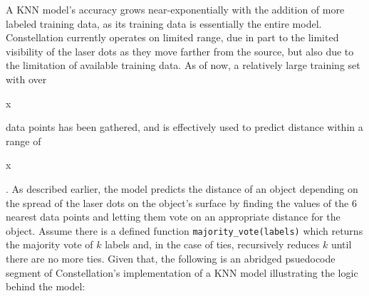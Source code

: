 

A KNN model's accuracy grows near-exponentially with the addition of more labeled training data, as its training data is essentially the entire model. Constellation currently operates on limited range, due in part to the limited visibility of the laser dots as they move farther from the source, but also due to the limitation of available training data. As of now, a relatively large training set with over \begin{it}x\end{it} data points has been gathered, and is effectively used to predict distance within a range of \begin{it}x\end{it}. As described earlier, the model predicts the distance of an object depending on the spread of the laser dots on the object's surface by finding the values of the 6 nearest data points and letting them vote on an appropriate distance for the object. Assume there is a defined function \texttt{majority\_vote(labels)} which returns the majority vote of $k$ labels and, in the case of ties, recursively reduces $k$ until there are no more ties. Given that, the following is an abridged psuedocode segment of Constellation's implementation of a KNN model illustrating the logic behind the model:

